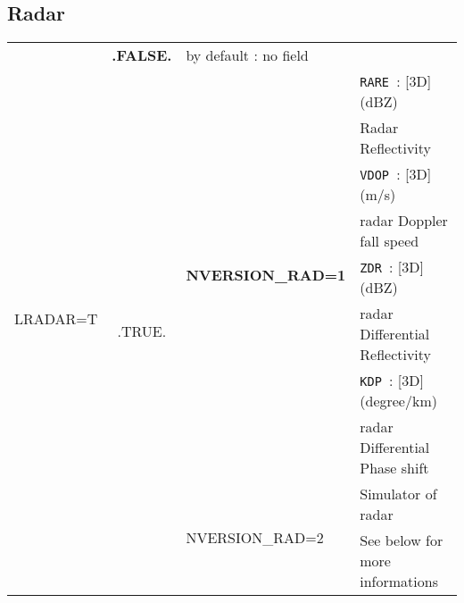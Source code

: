 \subsection{Radar}
\begin{center}
\begin{tabular}{|p{2.5cm}|c|l|p{6cm}|}
\hline
\multirow{11}{*}{LRADAR=T}\index{LRADAR!\innam{NAM\_DIAG}}&\textbf{.FALSE.} &\multicolumn{2}{|l|}{ by default : no field} \\\cline{2-4}
&\multirow{10}{*}{.TRUE.} &\multirow{8}{*}{ \textbf{NVERSION\_RAD=1}}\index{NVERSION\_RAD!\innam{NAM\_DIAG}}&{\tt RARE }: [3D] (dBZ)\\
&&& Radar Reflectivity \\\cline{4-4}
& &&{\tt VDOP }: [3D] (m/s)\\
&&&radar Doppler fall speed\\\cline{4-4}
& &&{\tt ZDR  }: [3D]  (dBZ)\\
&&&radar Differential Reflectivity\\\cline{4-4}
& &&{\tt KDP  }: [3D] (degree/km)\\
&&& radar Differential Phase shift \\\cline{3-4}
& &\multirow{2}{*}{NVERSION\_RAD=2}&Simulator of radar \\
& &&See below for more informations\\\hline
\end{tabular} 
\end{center}

